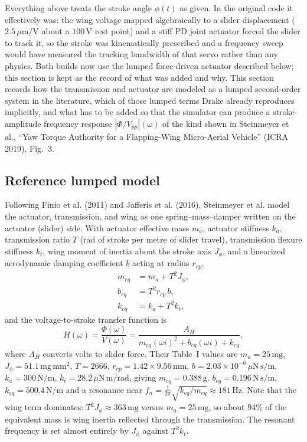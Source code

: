 \documentclass{article}
\begin{document}
Everything above treats the stroke angle \(\phi(t)\) as given. In the original code it effectively was: the wing voltage mapped algebraically to a slider displacement (\(2.5\,\mu\mathrm{m/V}\) about a \(100\,\mathrm{V}\) rest point) and a stiff PD joint actuator forced the slider to track it, so the stroke was kinematically prescribed and a frequency sweep would have measured the tracking bandwidth of that servo rather than any physics. Both builds now use the lumped force-driven actuator described below; this section is kept as the record of what was added and why. This section records how the transmission and actuator are modeled as a lumped second-order system in the literature, which of those lumped terms Drake already reproduces implicitly, and what has to be added so that the simulator can produce a stroke-amplitude frequency response \(|\Phi/V_{pp}|(\omega)\) of the kind shown in Steinmeyer et al., ``Yaw Torque Authority for a Flapping-Wing Micro-Aerial Vehicle'' (ICRA 2019), Fig.~3.

\subsection{Reference lumped model}
Following Finio et al. (2011) and Jafferis et al. (2016), Steinmeyer et al. model the actuator, transmission, and wing as one spring--mass--damper written on the actuator (slider) side. With actuator effective mass \(m_a\), actuator stiffness \(k_a\), transmission ratio \(T\) (rad of stroke per metre of slider travel), transmission flexure stiffness \(k_t\), wing moment of inertia about the stroke axis \(J_\phi\), and a linearized aerodynamic damping coefficient \(b\) acting at radius \(r_{cp}\),
\begin{align}
    m_{eq} &= m_a + T^2 J_\phi, \\
    b_{eq} &= T^2 r_{cp}\, b, \\
    k_{eq} &= k_a + T^2 k_t,
\end{align}
and the voltage-to-stroke transfer function is
\begin{equation}
    \label{eq:lumped_tf}
    H(\omega) = \frac{\Phi(\omega)}{V(\omega)} = \frac{A_H}{m_{eq}(\omega i)^2 + b_{eq}(\omega i) + k_{eq}},
\end{equation}
where \(A_H\) converts volts to slider force. Their Table~I values are \(m_a = 25\,\mathrm{mg}\), \(J_\phi = 51.1\,\mathrm{mg\,mm^2}\), \(T = 2666\), \(r_{cp} = 1.42\times 9.56\,\mathrm{mm}\), \(b = 2.03\times 10^{-6}\,\mu\mathrm{N\,s/m}\), \(k_a = 300\,\mathrm{N/m}\), \(k_t = 28.2\,\mu\mathrm{N\,m/rad}\), giving \(m_{eq} = 0.388\,\mathrm{g}\), \(b_{eq} = 0.196\,\mathrm{N\,s/m}\), \(k_{eq} = 500.4\,\mathrm{N/m}\) and a resonance near \(f_n = \frac{1}{2\pi}\sqrt{k_{eq}/m_{eq}} \approx 181\,\mathrm{Hz}\). Note that the wing term dominates: \(T^2 J_\phi \approx 363\,\mathrm{mg}\) versus \(m_a = 25\,\mathrm{mg}\), so about \(94\%\) of the equivalent mass is wing inertia reflected through the transmission. The resonant frequency is set almost entirely by \(J_\phi\) against \(T^2 k_t\).
\end{document}
